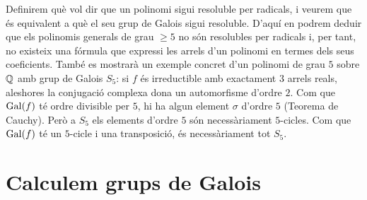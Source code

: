 \documentclass[
]{book}
\theoremstyle{definition}
\theoremstyle{definition}
\theoremstyle{definition}
\theoremstyle{definition}
\theoremstyle{remark}
\begin{document}
Definirem què vol dir que un polinomi sigui resoluble per radicals, i veurem
que és equivalent a què el seu grup de Galois sigui resoluble. D'aquí en podrem
deduir que els polinomis generals de grau \(\geq 5\) no són resolubles per radicals i,
per tant, no existeix una fórmula que expressi les arrels d'un polinomi en termes
dels seus coeficients. També es mostrarà un exemple concret d'un polinomi de grau \(5\) sobre \(\mathbb{Q}\)
amb grup de Galois \(S_5\): si \(f\) és irreductible amb exactament \(3\) arrels reals, aleshores la conjugació complexa dona un automorfisme d'ordre \(2\). Com que \(\operatorname{Gal}(f)\) té ordre divisible per \(5\), hi ha algun element \(\sigma\) d'ordre \(5\) (Teorema de Cauchy). Però a \(S_5\) els elements d'ordre \(5\) són necessàriament \(5\)-cicles. Com que \(\operatorname{Gal}(f)\) té un \(5\)-cicle i una transposició, és necessàriament tot \(S_5\).

\hypertarget{calculem-grups-de-galois}{%
\chapter{Calculem grups de Galois}\label{calculem-grups-de-galois}}

\nocite{*}

  
\end{document}
